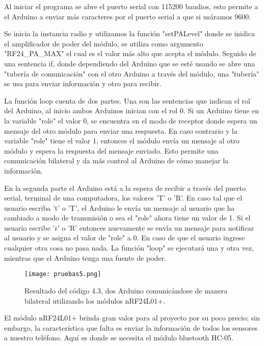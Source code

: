 \par \noindent
Al iniciar el programa se abre el puerto serial con 115200 baudios, esto permite a el Arduino a enviar más caracteres por el puerto serial a que si usáramos 9600. 

Se inicia la instancia radio y utilizamos la función "setPALevel" donde se inidica el amplificador de poder del módulo, se utiliza como argumento "RF24\_PA\_MAX" el cual es el valor más alto que acepta el módulo. Seguido de una sentencia if, donde dependiendo del Arduino que se esté usando se abre una "tubería de comunicación" con el otro Arduino a través del módulo, una "tubería" se usa para enviar información y otro para recibir.

\par \noindent
La función loop cuenta de dos partes. Una son las sentencias que indican el rol del Arduino, al inicio ambos Arduinos inician con el rol 0. Si un Arduino tiene en la variable "role" el valor 0, se encuentra en el modo de receptor donde espera un mensaje del otro módulo para enviar una respuesta. En caso contrario y la variable "role" tiene el valor 1, entonces el módulo envía un mensaje al otro módulo y espera la respuesta del mensaje enviado. Esto permite una comunicación bilateral y da más control al Arduino de cómo manejar la información.

\par \noindent
En la segunda parte el Arduino está a la espera de recibir a través del puerto serial, terminal de una computadora, los valores 'T' o 'R'. En caso tal que el usuario escriba 't' o 'T', el Arduino le envía un mensaje al usuario que ha cambiado a modo de transmisión o sea el "role" ahora tiene un valor de 1. Si el usuario escribe 'r' o 'R' entonces nuevamente se envía un mensaje para notificar al usuario y se asigna el valor de "role" a 0. En caso de que el usuario ingrese cualquier otra cosa no pasa nada. La función "loop" se ejecutará una y otra vez, mientras que el Arduino tenga una fuente de poder.

\begin{figure}[H]
	\centering
	\texttt{[image: pruebas5.png]}
	\caption{Resultado del código 4.3, dos Arduino comunicándose de manera bilateral utilizando los módulos nRF24L01+.}
\end{figure}

\par \noindent
El módulo nRF24L01+ brinda gran valor para al proyecto por su poco precio; sin embargo, la característica que falta es enviar la información de todos los sensores a nuestro teléfono. Aquí es donde se necesita el módulo bluetooth HC-05.  

